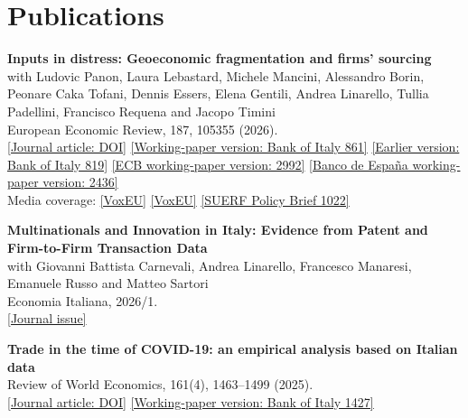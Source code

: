 \documentclass[11pt,a4paper]{article}
\begin{document}
\section*{Publications}
\noindent\begin{minipage}{\linewidth}
\textbf{Inputs in distress: Geoeconomic fragmentation and firms' sourcing}\\
with Ludovic Panon, Laura Lebastard, Michele Mancini, Alessandro Borin, Peonare Caka Tofani, Dennis Essers, Elena Gentili, Andrea Linarello, Tullia Padellini, Francisco Requena and Jacopo Timini\\
European Economic Review, 187, 105355 (2026).\\
\href{https://doi.org/10.1016/j.euroecorev.2026.105355}{[Journal article: DOI]} \href{https://www.bancaditalia.it/pubblicazioni/qef/2024-0861/index.html?com.dotmarketing.htmlpage.language=1}{[Working-paper version: Bank of Italy 861]} \href{https://www.bancaditalia.it/pubblicazioni/qef/2023-0819/index.html?com.dotmarketing.htmlpage.language=1}{[Earlier version: Bank of Italy 819]} \href{https://www.ecb.europa.eu/pub/pdf/scpwps/ecb.wp2992~ccb9cb4a80.en.pdf}{[ECB working-paper version: 2992]} \href{https://www.bde.es/f/webbe/SES/Secciones/Publicaciones/PublicacionesSeriadas/DocumentosTrabajo/24/Files/dt2436e.pdf}{[Banco de España working-paper version: 2436]}
\\ Media coverage: \href{https://cepr.org/voxeu/columns/critical-input-disruptions-mapping-out-road-eu-resilience}{[VoxEU]} \href{https://cepr.org/voxeu/columns/inputs-geopolitical-distress-risk-assessment-based-micro-data}{[VoxEU]} \href{https://www.suerf.org/publications/suerf-policy-notes-and-briefs/inputs-in-distress-geoeconomic-fragmentation-and-firms-sourcing/}{[SUERF Policy Brief 1022]}
\end{minipage}\par\medskip
\noindent\begin{minipage}{\linewidth}
\textbf{Multinationals and Innovation in Italy: Evidence from Patent and Firm-to-Firm Transaction Data}\\
with Giovanni Battista Carnevali, Andrea Linarello, Francesco Manaresi, Emanuele Russo and Matteo Sartori\\
Economia Italiana, 2026/1.\\
\href{https://economiaitaliana.org/pubblicazioni/}{[Journal issue]}
\end{minipage}\par\medskip
\noindent\begin{minipage}{\linewidth}
\textbf{Trade in the time of COVID-19: an empirical analysis based on Italian data}\\
Review of World Economics, 161(4), 1463--1499 (2025).\\
\href{https://doi.org/10.1007/s10290-025-00586-4}{[Journal article: DOI]} \href{https://www.bancaditalia.it/pubblicazioni/temi-discussione/2023/2023-1427/index.html?com.dotmarketing.htmlpage.language=1}{[Working-paper version: Bank of Italy 1427]}
\end{minipage}\par\medskip
\end{document}
